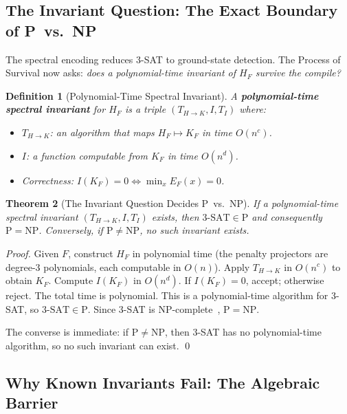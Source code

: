 \documentclass[11pt,letterpaper]{article}
\newtheorem{theorem}{Theorem}[section]
\newtheorem{definition}[theorem]{Definition}
\begin{document}
\subsection{The Invariant Question: The Exact Boundary of P~vs.~NP}

The spectral encoding reduces 3-SAT to ground-state detection.  The
Process of Survival now asks: \emph{does a polynomial-time invariant of
$H_F$ survive the compile?}

\begin{definition}[Polynomial-Time Spectral Invariant]
\label{def:invariant}
A \textbf{polynomial-time spectral invariant} for $H_F$ is a triple
$(T_{H \to K}, I, T_I)$ where:
\begin{itemize}[nosep]
\item $T_{H \to K}$: an algorithm that maps $H_F \mapsto K_F$ in time $O(n^c)$.
\item $I$: a function computable from $K_F$ in time $O(n^d)$.
\item Correctness: $I(K_F) = 0 \iff \min_x E_F(x) = 0$.
\end{itemize}
\end{definition}

\begin{theorem}[The Invariant Question Decides P~vs.~NP]
\label{thm:pnp}
If a polynomial-time spectral invariant $(T_{H \to K}, I, T_I)$ exists,
then $3\text{-SAT} \in \mathrm{P}$ and consequently $\mathrm{P} = \mathrm{NP}$.
Conversely, if $\mathrm{P} \neq \mathrm{NP}$, no such invariant exists.
\end{theorem}
\begin{proof}
Given $F$, construct $H_F$ in polynomial time (the penalty projectors are
degree-3 polynomials, each computable in $O(n)$).  Apply $T_{H \to K}$
in $O(n^c)$ to obtain $K_F$.  Compute $I(K_F)$ in $O(n^d)$.  If
$I(K_F) = 0$, accept; otherwise reject.  The total time is polynomial.
This is a polynomial-time algorithm for 3-SAT, so $3\text{-SAT} \in \mathrm{P}$.
Since 3-SAT is NP-complete~\cite{cook1971}, $\mathrm{P} = \mathrm{NP}$.

The converse is immediate: if $\mathrm{P} \neq \mathrm{NP}$, then 3-SAT
has no polynomial-time algorithm, so no such invariant can exist.  \qed
\end{proof}

\subsection{Why Known Invariants Fail: The Algebraic Barrier}
\end{document}
